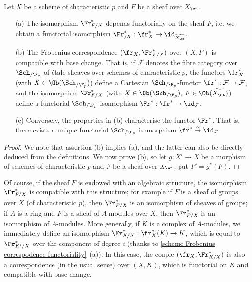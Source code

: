 \begin{proposition}\label{scheme Frobenius correspodence functoriality}
Let $X$ be a scheme of characteristic $p$ and $F$ be a sheaf over $X_\et$.
\begin{enumerate}
    \item[(a)] The isomorphism $\Fr_{F/X}^*$ depends functorially on the sheaf $F$, i.e. we obtain a functorial isomorphism $\Fr^*_{/X}:\fr_X^*\to\id_{\widetilde{X_\et}}$.
    \item[(b)] The Frobenius correspondence $(\fr_X,\Fr_{F/X}^*)$ over $(X,F)$ is compatible with base change. That is, if $\mathcal{F}$ denotes the fibre category over $\Sch_{/\F_p}$ of \'etale sheaves over schemes of characteristic $p$, the functors $\fr_X^*$ (with $X\in\Ob(\Sch_{/\F_p})$) define a Cartesian $\Sch_{/\F_p}$-functor $\fr^*:\mathcal{F}\to\mathcal{F}$, and the isomorphism $\Fr_{F/X}^*$ (with $X\in\Ob(\Sch_{/\F_p})$, $F\in\Ob(\widetilde{X_\et})$) define a functorial $\Sch_{/\F_p}$-isomorphism $\Fr^*:\fr^*\to\id_{\mathcal{F}}$.
    \item[(c)] Conversely, the properties in (b) characterise the functor $\Fr^*$. That is, there exists a unique functorial $\Sch_{/\F_p}$-isomorphism $\fr^*\stackrel{\sim}{\to}\id_\mathcal{F}$.
\end{enumerate}
\end{proposition}
\begin{proof}
We note that assertion (b) implies (a), and the latter can also be directly deduced from the definitions. We now prove (b), so let $g:X'\to X$ be a morphism of schemes of characteristic $p$ and $F$ be a sheaf over $X_\et$; put $F'=g^*(F)$.
\end{proof}

Of course, if the sheaf $F$ is endowed with an algebraic structure, the isomorphism $\Fr_{F/X}^*$ is compatible with this structure; for example if $F$ is a sheaf of groups over $X$ (of characteristic $p$), then $\Fr_{F/X}^*$ is an isomorphism of sheaves of groups; if $A$ is a ring and $F$ is a sheaf of $A$-modules over $X$, then $\Fr_{F/X}^*$ is an isomorphism of $A$-modules. More generally, if $K$ is a complex of $A$-modules, we immediately define an isomorphism $\Fr_{K/X}^*:\fr_X^*(K)\to K$, which is equal to $\Fr_{K^i/X}^*$ over the component of degree $i$ (thanks to \cref{scheme Frobenius correspodence functoriality}~(a)). In this case, the couple $(\fr_X,\Fr_{K/X}^*)$ is also a correspondence (in the usual sense) over $(X,K)$, which is functorial on $K$ and compatible with base change.

